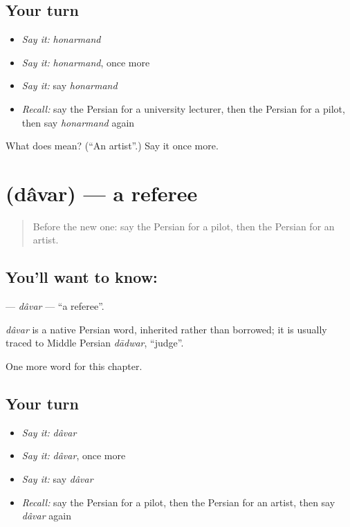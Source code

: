\subsection*{Your turn}
\begin{itemize}
\raggedright
  \item \emph{Say it:} \emph{honarmand}
  \item \emph{Say it:} \emph{honarmand}, once more
  \item \emph{Say it:} say \emph{honarmand}
  \item \emph{Recall:} say the Persian for a university lecturer, then the Persian for a pilot, then say \emph{honarmand} again
\end{itemize}

\begin{tcolorbox}[breakable,colback=teal!4,colframe=teal!35!black,title={Before you move on}]
What does  mean? (\textquotedblleft{}An artist\textquotedblright{}.) Say it once more.
\end{tcolorbox}
\section[\texorpdfstring{\fa{داور} (dâvar)}{داور (dâvar)}]{ (dâvar) — a referee}

\label{lesson:FA-C251-davar}



\begin{quote}
Before the new one: say the Persian for a pilot, then the Persian for an artist.
\end{quote}

\subsection*{You'll want to know: }
\textbf{} — \emph{dâvar} — \textquotedblleft{}a referee\textquotedblright{}.

\begin{cousinweb}
\emph{dâvar} is a native Persian word, inherited rather than borrowed; it is usually traced to Middle Persian \emph{dādwar}, \textquotedblleft{}judge\textquotedblright{}.
\end{cousinweb}

\begin{grammarlens}[title={What you've built}]
One more word for this chapter.
\end{grammarlens}

\subsection*{Your turn}
\begin{itemize}
\raggedright
  \item \emph{Say it:} \emph{dâvar}
  \item \emph{Say it:} \emph{dâvar}, once more
  \item \emph{Say it:} say \emph{dâvar}
  \item \emph{Recall:} say the Persian for a pilot, then the Persian for an artist, then say \emph{dâvar} again
\end{itemize}

